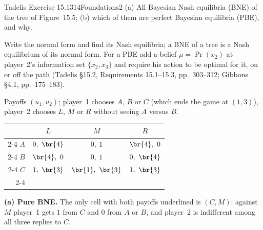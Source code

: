 \begin{exsol}{Tadelis Exercise 15.1}{314}{Foundations}{2}
\asked (a) All Bayesian Nash equilibria (BNE) of the tree of Figure~15.5; (b) which of them are
perfect Bayesian equilibria (PBE), and why.

\method Write the normal form and find its Nash equilibria; a BNE of a tree is a Nash
equilibrium of its normal form. For a PBE add a belief $\mu = \Pr(x_2)$ at player~2's information
set $\{x_2, x_3\}$ and require his action to be optimal for it, on or off the path (Tadelis
\S15.2, Requirements 15.1--15.3, pp.~303--312; Gibbons \S4.1, pp.~175--183).

\solution Payoffs $(u_1, u_2)$; player~1 chooses $A$, $B$ or $C$ (which ends the game at $(1,3)$),
player~2 chooses $L$, $M$ or $R$ without seeing $A$ versus $B$.
\begin{center}
\begin{tabular}{r|c|c|c|}
\multicolumn{1}{r}{} & \multicolumn{1}{c}{$L$} & \multicolumn{1}{c}{$M$} & \multicolumn{1}{c}{$R$}\\ \cline{2-4}
$A$ & $0,\ \br{4}$ & $0,\ 1$ & $\br{4},\ 0$ \\ \cline{2-4}
$B$ & $\br{4},\ 0$ & $0,\ 1$ & $0,\ \br{4}$ \\ \cline{2-4}
$C$ & $1,\ \br{3}$ & $\br{1},\ \br{3}$ & $1,\ \br{3}$ \\ \cline{2-4}
\end{tabular}
\end{center}
\textbf{(a) Pure BNE.} The only cell with both payoffs underlined is $(C, M)$: against $M$ player~1
gets $1$ from $C$ and $0$ from $A$ or $B$, and player~2 is indifferent among all three replies to $C$.


\end{exsol}
